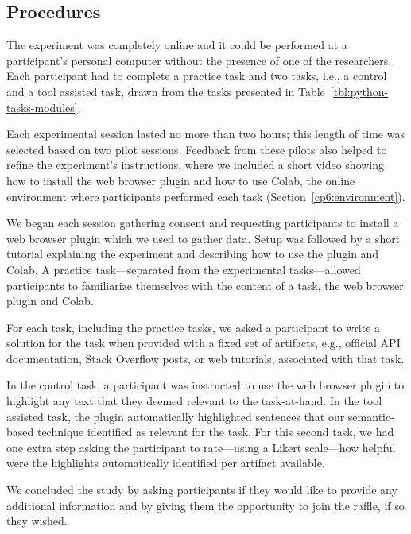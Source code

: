 {\subsection{Procedures}
\label{cp6:evaluation-procedures}



The experiment was completely online and it could be performed at a participant's personal computer
without the presence of one of the researchers. Each participant had to complete a practice task and two tasks, i.e., a control and a tool assisted task, drawn from the tasks presented in Table~\ref{tbl:python-tasks-modules}. 


Each experimental session lasted no more than two hours; this length of time was selected based on two pilot sessions. 
Feedback from these pilots also helped to refine the experiment's instructions, where we included a short video showing how to install the web browser plugin and how to use Colab, the online environment where participants performed each task (Section~\ref{cp6:environment}).






We began each session gathering consent and requesting participants to install a web browser plugin which we used to gather data.
Setup was followed by a short tutorial explaining the experiment and describing how to use the plugin and Colab. 
A practice task---separated from the experimental tasks---allowed participants to familiarize themselves with the content of a task, the web browser plugin and Colab. 



For each task, including the practice tasks, we asked a participant to write a solution for the task
when provided with a fixed set of artifacts, e.g., official API documentation, Stack Overflow posts, or web tutorials, 
associated with that task.  


In the control task, a participant was instructed to use the web browser plugin to highlight any text that they deemed relevant to the task-at-hand. 
In the tool assisted task, the plugin automatically highlighted sentences that our semantic-based technique identified as relevant for the task. 
For this second task, we had one extra step asking the participant to rate---using a Likert scale---how helpful were the highlights automatically identified per artifact available. 


We concluded the study by asking participants if they would like to provide any additional information and 
by giving them the opportunity to join the raffle, if so they wished. 



}

